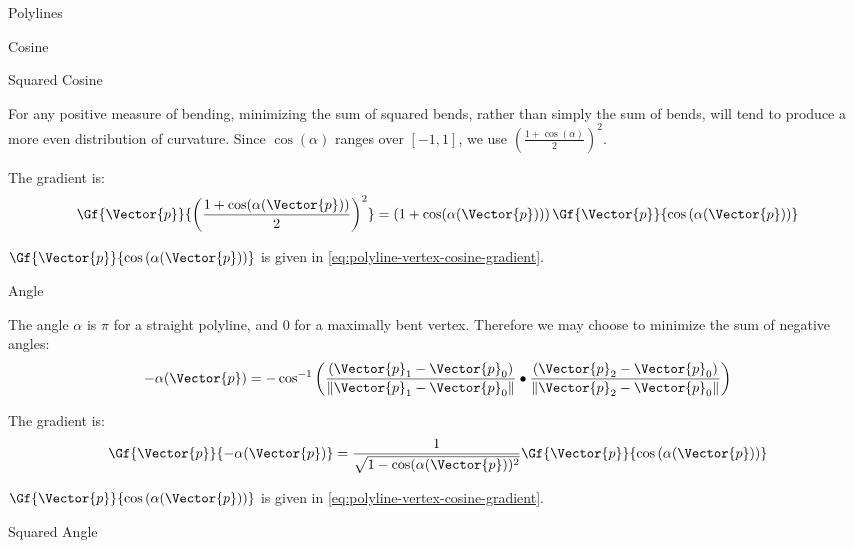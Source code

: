\begin{plSection}{Polylines}
\begin{plSection}{Cosine}
\end{plSection}%
\begin{plSection}{Squared Cosine}
\label{sec:polyline-vertex-squared-cosine}

For any positive measure of bending,
minimizing the sum of squared bends,
rather than simply the sum of bends,
will tend to produce a more even distribution of curvature.
Since $\cos(\alpha)$ ranges over $[-1,1]$,
we use $\left( \frac{1 + \cos(\alpha)}{2} \right)^2$.

The gradient is:
\begin{equation}
\Gf{\Vector{p}}{\left( {{1 + \cos(\alpha(\Vector{p}))} \over 2} \right)^2}
=
\left( 1 + \cos(\alpha(\Vector{p})) \right)
\Gf{\Vector{p}}{\cos\left(\alpha(\Vector{p})\right)}
\end{equation}

$\Gf{\Vector{p}}{\cos\left(\alpha(\Vector{p})\right)}$ is given
in \cref{eq:polyline-vertex-cosine-gradient}.

\end{plSection}%
\begin{plSection}{Angle}
\label{sec:polyline-vertex-angle}


The angle $\alpha$ is $\pi$ for a straight polyline,
and $0$ for a maximally bent vertex.
Therefore we may choose to minimize the sum of negative angles:
\begin{equation}
-\alpha(\Vector{p}) =
-\cos^{-1} \left(
{{(\Vector{p}_1 - \Vector{p}_0)} \over {\| \Vector{p}_1 - \Vector{p}_0 \|} }
\bullet
{{(\Vector{p}_2 - \Vector{p}_0)} \over {\| \Vector{p}_2 - \Vector{p}_0 \|} }
\right)
\end{equation}

The gradient is:
\begin{equation}
\Gf{\Vector{p}}{-\alpha(\Vector{p})}
=
{{1} \over {\sqrt{ 1 - \cos(\alpha(\Vector{p}))^2}}}
\Gf{\Vector{p}}{\cos\left(\alpha(\Vector{p})\right)}
\end{equation}

$\Gf{\Vector{p}}{\cos\left(\alpha(\Vector{p})\right)}$ is given
in \cref{eq:polyline-vertex-cosine-gradient}.

\end{plSection}%
\begin{plSection}{Squared Angle}
\label{sec:polyline-vertex-squared-angle}


\end{plSection}
\end{plSection}
